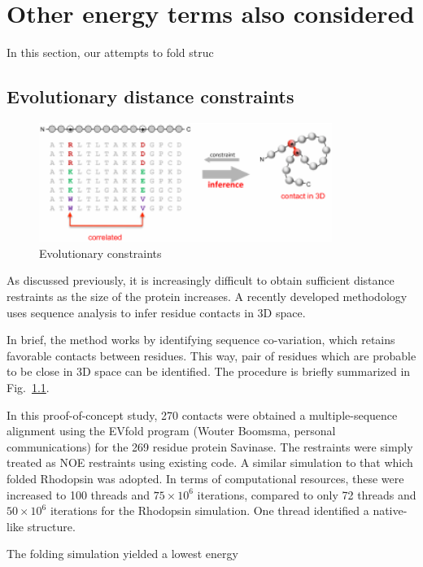 \chapter{Other energy terms also considered}

In this section, our attempts to fold struc

\section{Evolutionary distance constraints}

\begin{figure}
    \centering
    \includegraphics[width=0.85\textwidth]{figures/evo_constraint.pdf}
    \caption{Evolutionary constraints}
    \label{fig:evo_constraint}
\end{figure}

As discussed previously, it is increasingly difficult to obtain sufficient distance restraints as the size of the protein increases.
A recently developed methodology uses sequence analysis to infer residue contacts in 3D space. 

In brief, the method works by identifying sequence co-variation, which retains favorable contacts between residues.
This way, pair of residues which are probable to be close in 3D space can be identified.
The procedure is briefly summarized in Fig.~\ref{fig:evo_constraint}.

In this proof-of-concept study, 270 contacts were obtained a multiple-sequence alignment using the EVfold program (Wouter Boomsma, personal communications) for the 269 residue protein Savinase.
The restraints were simply treated as NOE restraints using existing code.
A similar simulation to that which folded Rhodopsin was adopted. 
In terms of computational resources, these were increased to 100 threads and $75 \times 10^6$ iterations, compared to only 72 threads and $50 \times 10^6$ iterations for the Rhodopsin simulation.
One thread identified a native-like structure.

The folding simulation yielded a lowest energy 



